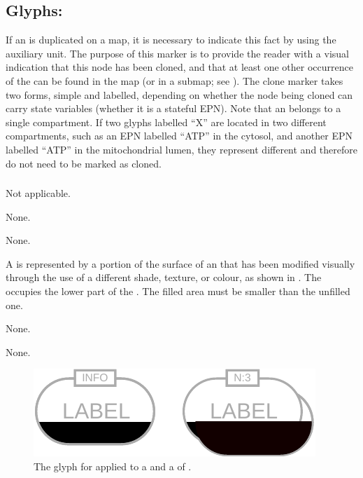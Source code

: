 \subsection{Glyphs: }
\label{sec:cloneMarker}

If an  is duplicated on a map, it is necessary to indicate this fact by using the  auxiliary unit.
The purpose of this marker is to provide the reader with a visual indication that this node has been cloned, and that at least one other occurrence of the  can be found in the map (or in a submap; see ).
The clone marker takes two forms, simple and labelled, depending on whether the node being cloned can carry state variables (\ie whether it is a stateful EPN).
Note that an  belongs to a single compartment.
If two glyphs labelled ``X'' are located in two different compartments, such as an EPN labelled ``ATP'' in the cytosol, and another EPN labelled ``ATP'' in the mitochondrial lumen, they represent different  and therefore do not need to be marked as cloned.

\subsubsection{}

\begin{glyphDescription}

\glyphSboTerm
Not applicable.

\glyphIncoming
None.

\glyphOutgoing
None.

\glyphContainer
A  is represented by a portion of the surface of an  that has been modified visually through the use of a different shade, texture, or colour, as shown in .
The  occupies the lower part of the .
The filled area must be smaller than the unfilled one.

\glyphLabel
None.

\glyphAux
None.

\end{glyphDescription}

\begin{figure}[H]
  \centering
  \includegraphics{images/build/simple_clone_marker.pdf}
  \caption{The \PD glyph for  applied to a  and a  of .}
  \label{fig:simpleCloneMarker}
\end{figure}

